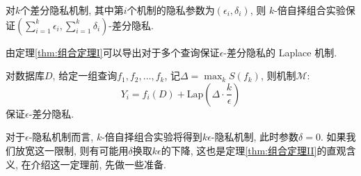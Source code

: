 \begin{thm}[组合定理 I]\label{thm:组合定理I}
  对$k$个差分隐私机制, 其中第$i$个机制的隐私参数为$(\epsilon_i, \delta_i)$, 则 $k$-倍自择组合实验保证$\left(\sum_{i=1}^k\epsilon_i, \sum_{i=1}^k\delta_i\right)$-差分隐私.
\end{thm}
由定理\ref{thm:组合定理I}可以导出对于多个查询保证$\epsilon$-差分隐私的 Laplace 机制.
\begin{prop}[Laplace 机制 I]\label{prop:Laplace 机制 I}
  对数据库$D$, 给定一组查询$f_1, f_2, \dots, f_k$, 记$\Delta = \max_k S(f_k)$, 则机制$\mathcal{M}$:
  \[
    Y_i = f_i(D) + \mathrm{Lap}\left(\Delta\cdot\frac{k}{\epsilon}\right)
  \]
  保证$\epsilon$-差分隐私.
\end{prop}
对于$\epsilon$-隐私机制而言, $k$-倍自择组合实验将得到$k\epsilon$-隐私机制, 此时参数$\delta = 0$. 如果我们放宽这一限制, 则有可能用$\delta$换取$k\epsilon$的下降, 这也是定理\ref{thm:组合定理II}的直观含义, 在介绍这一定理前, 先做一些准备.

